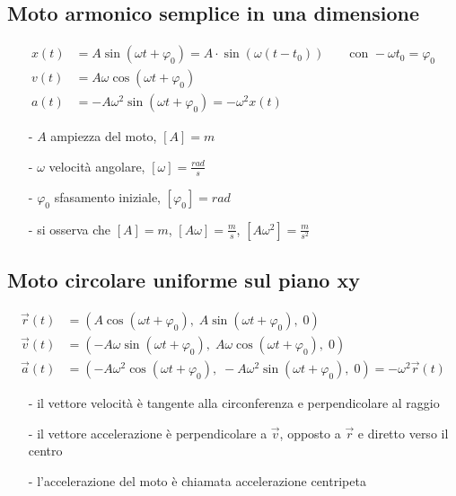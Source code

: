 \documentclass[a4paper]{article}
\begin{document}
\newpage

\subsection{Moto armonico semplice in una dimensione}
\begin{align*}
	x(t) &= A \sin (\omega t + \varphi_0) = A \cdot \sin (\omega (t - t_0)) \qquad \text{con } -\omega t_0 = \varphi_0 \\
	v(t) &= A \omega \cos (\omega t + \varphi_0) \\
	a(t) &= -A \omega^2 \sin (\omega t + \varphi_0) = -\omega^2 x(t)
\end{align*}
\begin{itemize}[topsep=3pt, itemsep=0pt]
	\item[-] \(A\) ampiezza del moto, \(\left[A\right] = m\)
	\item[-] \(\omega\) velocità angolare, \(\left[\omega\right] = \frac{rad}{s}\)
	\item[-] \(\varphi_0\) sfasamento iniziale, \(\left[\varphi_0\right] = rad\)
	\item[-] si osserva che \(\left[A\right] = m\), \(\left[A\omega\right] = \frac{m}{s}\), \(\left[A\omega^2\right] = \frac{m}{s^2}\)
\end{itemize}

\subsection{Moto circolare uniforme sul piano xy}
\begin{align*}
	\vec{r}(t) &= \left(A \cos (\omega t + \varphi_0), \; A \sin (\omega t + \varphi_0), \; 0\right) \\
	\vec{v}(t) &= \left(-A \omega \sin (\omega t + \varphi_0), \; A \omega \cos (\omega t + \varphi_0), \; 0 \right) \\
	\vec{a}(t) &= \left(-A \omega^2 \cos (\omega t + \varphi_0), \; -A \omega^2 \sin (\omega t + \varphi_0), \; 0 \right) = -\omega^2 \vec{r}(t)
\end{align*}
\begin{itemize}[topsep=3pt, itemsep=0pt]
	\item[-] il vettore velocità è tangente alla circonferenza e perpendicolare al raggio
	\item[-] il vettore accelerazione è perpendicolare a \(\vec{v}\), opposto a \(\vec{r}\) e diretto verso il centro
	\item[-] l'accelerazione del moto è chiamata accelerazione centripeta
\end{itemize}
\end{document}
